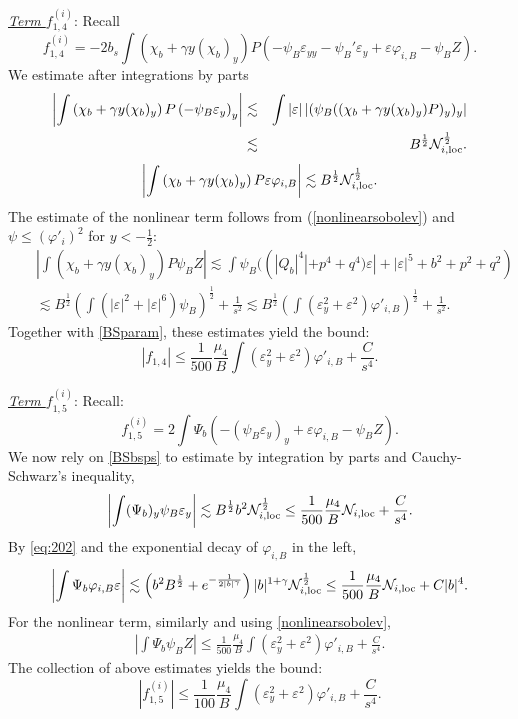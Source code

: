 \documentclass[11pt,a4paper,reqno]{amsart}
\theoremstyle{remark}
\numberwithin{equation}{section}
\newcommand{\bee}{\begin{eqnarray*}}
\newcommand{\eee}{\end{eqnarray*}}
\def\fref#1{{\rm (\ref{#1})}}
\def\e{\varepsilon}
\def\fref#1{{\rm (\ref{#1})}}
\begin{document}
\medskip

\underline{{\em Term $f^{(i)}_{1,4}$}}:  Recall
$$
f^{(i)}_{1,4} = - 2{b}_{s}  \int   \left(\chi_b   + \gamma   y (\chi_b)_y\right) P  \left(   - \psi_B\varepsilon_{yy} -\psi_B'\e_y+ \varepsilon \varphi_{i,B}-\psi_BZ   \right).$$
 We estimate after   integrations by parts
 \bee
 \left| \int   \left(\chi_b   + \gamma   y (\chi_b)_y\right) P  \left(   - \psi_B\varepsilon_{y } \right)_y\right|&\lesssim& \int|\e|\left|(\psi_B (  (\chi_b   + \gamma   y (\chi_b)_y) P)_y)_y\right| \\
 & \lesssim & B^{\frac 12}\mathcal{N}_{i,\rm loc}^{\frac 12}.
 \eee
 $$\left|\int   \left(\chi_b   + \gamma   y (\chi_b)_y\right) P \varepsilon \varphi_{i,B}\right|\lesssim B^{\frac 12}\mathcal{N}_{i,\rm loc}^{\frac 12}.$$ The estimate of the nonlinear term follows from   \fref{nonlinearsobolev} and $\psi\leq (\varphi'_i)^2$ for $y<-\frac 12$:
 \bee
 && \left|\int   \left(\chi_b   + \gamma   y (\chi_b)_y\right) P \psi_BZ\right|  \lesssim  \int\psi_B((|Q_b|^4|+p^4+q^4) \e|+|\e|^5
 +b^2 + p^2 + q^2)\\
 && \lesssim    B^{\frac 12}\left( \int (|\e|^2+ |\e|^6) \psi_B\right)^{\frac 12} +\frac 1{s^2}  \lesssim B^{\frac 12}
\left(\int   \left(\varepsilon_y^2+\e^2\right)   \varphi'_{i,B} \right)^{\frac 12} 
+\frac 1{s^2}  .
 \eee 
Together with \eqref{BSparam}, these estimates yield the bound:
$$|f_{1,4}| 
\leq  \frac 1 {500}  \frac {\mu_4} {B } 
 \int   \left(\varepsilon_y^2+\e^2\right)   \varphi'_{i,B}   +\frac C{s^4}.$$
 
 \medskip
 
\underline{{\em Term $f^{(i)}_{1,5}$}}:  Recall:
$$
f^{(i)}_{1,5}=    
 2  \int  \Psi_b    \left(   -(\psi_B\varepsilon_{y})_y  + \varepsilon \varphi_{i,B}-\psi_B Z   \right).
$$
We now rely on \eqref{BSbsps} to estimate by integration by parts and Cauchy-Schwarz's inequality,
$$
\left|  \int  (\Psi_b)_y    \psi_B\varepsilon_{y}\right| \lesssim    B^{\frac 12}  b^2 \mathcal{N}_{i,\rm loc}^{\frac12} \leq  \frac 1 {500}  \frac {\mu_4} {B} \mathcal{N}_{i,\rm loc} +\frac C{s^4}.
$$
By \eqref{eq:202}  and   the exponential decay of $\varphi_{i,B}$ in the left,
$$\left|  \int  \Psi_b \varphi_{i,B}\e\right|\lesssim \left( b^2 B^{\frac 12}+ e^{-\frac 1{2 |b|^{\gamma}}}\right)|b|^{1+\gamma}\mathcal{N}_{i,\rm loc}^{\frac12}\leq  \frac 1 {500}  \frac {\mu_4} {B } \mathcal{N}_{i,\rm loc} +C|b|^{4}.$$ For the nonlinear term, similarly and using \eqref{nonlinearsobolev},
\bee
 \left| \int  \Psi_b   \psi_B Z   \right|  \leq  \frac 1 {500}  \frac {\mu_4} {B} \int   \left(\varepsilon_y^2+\e^2\right)   \varphi'_{i,B}  +\frac C{s^4}.
\eee
The collection of above estimates yields the bound:
$$
| f^{(i)}_{1,5}| \leq \frac 1 {100}  \frac {\mu_4} {B} \int   \left(\varepsilon_y^2+\e^2\right)   \varphi'_{i,B}+\frac C{s^4}.$$
\medskip
 
\end{document}

